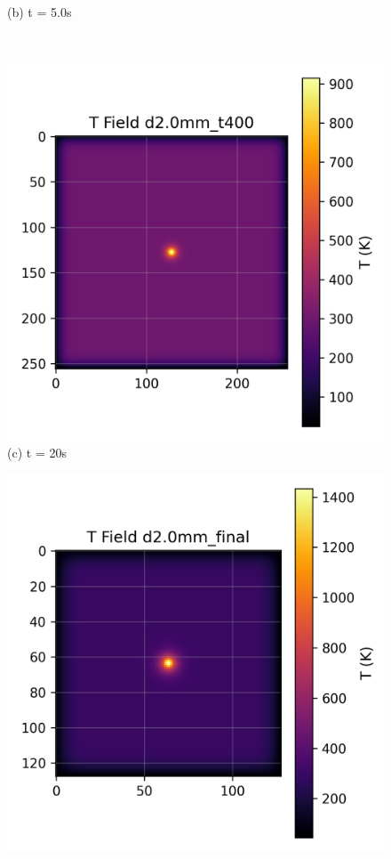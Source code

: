 \begin{figure}[H]
\begin{minipage}{0.48\textwidth}
        \\{\small (b) t = 5.0s}
    \end{minipage}
    \\
    \begin{minipage}{0.48\textwidth}
        \centering
        \includegraphics[width=\textwidth]{figures/simulations/field_d2.0mm_t400.png}
        \\{\small (c) t = 20s}
    \end{minipage}
    \hfill
    \begin{minipage}{0.48\textwidth}
        \centering
        \includegraphics[width=\textwidth]{figures/simulations/field_d2.0mm_final.png}

\end{minipage}
\end{figure}
